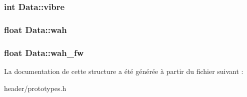 \subsubsection[{\texorpdfstring{vibre}{vibre}}]{\setlength{\rightskip}{0pt plus 5cm}int Data\+::vibre}\hypertarget{structData_ab76b1197ccfe12ef51640e6c42eb2b9a}{}\label{structData_ab76b1197ccfe12ef51640e6c42eb2b9a}
\subsubsection[{\texorpdfstring{wah}{wah}}]{\setlength{\rightskip}{0pt plus 5cm}float Data\+::wah}\hypertarget{structData_a53265f6c12c21b95ad5f0828d9b748aa}{}\label{structData_a53265f6c12c21b95ad5f0828d9b748aa}
\subsubsection[{\texorpdfstring{wah\+\_\+fw}{wah_fw}}]{\setlength{\rightskip}{0pt plus 5cm}float Data\+::wah\+\_\+fw}\hypertarget{structData_a5755f20c0c466ee6f8c2ef48234b83ba}{}\label{structData_a5755f20c0c466ee6f8c2ef48234b83ba}


La documentation de cette structure a été générée à partir du fichier suivant \+:\begin{DoxyCompactItemize}
\item 
header/prototypes.\+h\end{DoxyCompactItemize}
